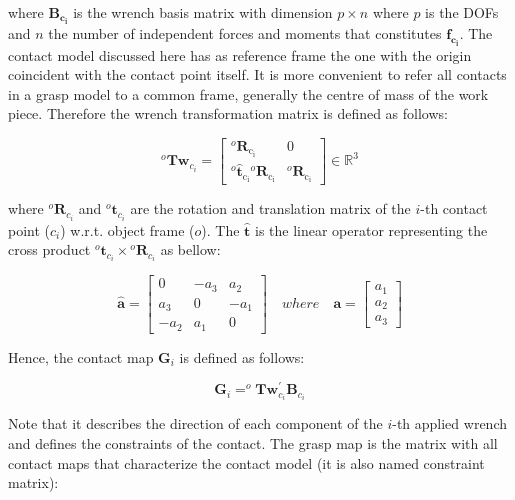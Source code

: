 \noindent
where $\mathbf{{B}_{c_i}}$ is the wrench basis matrix with dimension $p \times n$ where $p$ is the \acp{DOF} and $n$ the number of independent forces and moments that constitutes $\mathbf{{f}_{c_i}}$. The contact model discussed here has as reference frame the one with the origin coincident with the contact point itself. It is more convenient to refer all contacts in a grasp model to a common frame, generally the centre of mass of the work piece. Therefore the wrench transformation matrix is defined as follows:

\begin{equation}
^{o} \mathbf{Tw}_{c_i}=\left[\begin{array}{cc}
{^{o} \mathbf{R}_{\mathrm{c_i}}} & {0} \\
{^o \hat{\mathbf{t}}_{\mathrm{c_i}} {}^{o} \mathbf{R}_{\mathrm{c_i}}} & {^{o} \mathbf{R}_{\mathrm{c_i}}}
\end{array}\right]
\in \mathbb{R}^3
\end{equation}

\noindent
where $ ^o\mathbf{R}_{c_i}$ and $^o\mathbf{t}_{c_i}$ are the rotation and translation matrix of the $i$-th contact point ($c_i$) w.r.t. object frame ($o$). The $\mathbf{\hat{t}}$ is the linear operator representing the cross product $^o\mathbf{t}_{c_i} \times {{{}^o}\mathbf{R}}_{c_i}$ as bellow:

\begin{equation}
\widehat{\boldsymbol{a}}=\left[\begin{array}{ccc}
0 & -a_{3} & a_{2} \\
a_{3} & 0 & -a_{1} \\
-a_{2} & a_{1} & 0
\end{array}\right] \quad where \quad \boldsymbol{a} = \left[\begin{array}{c}
a_{1} \\
a_{2} \\
a_{3}
\end{array}\right]
\end{equation}


Hence, the contact map $\mathbf{G}_{i}$ is defined as follows:

\begin{equation}
\mathbf{G}_{i}=^{o} \mathbf{T} \mathbf{w}_{c_i}^{\prime} \mathbf{B}_{c_i}
\end{equation}

Note that it describes the direction of each component of the $i$-th applied wrench and defines the constraints of the contact. The grasp map is the matrix with all contact maps that characterize the contact model (it is also named constraint matrix):

